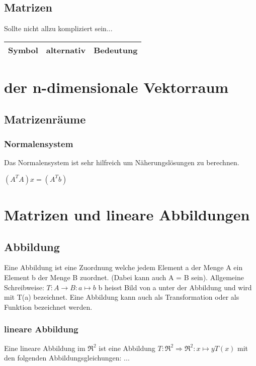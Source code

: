 \documentclass[11pt,a4paper,onecolumn]{article}
\begin{document}
\begin{flushleft}
\subsection{Matrizen}
Sollte nicht allzu kompliziert sein... \linebreak
\begin{tabular}{|c|c|c|}
\hline
Symbol & alternativ & Bedeutung \\
\hline


\end{tabular}
\section{der n-dimensionale Vektorraum}
\subsection{Matrizenräume}
\subsubsection{Normalensystem}
Das Normalensystem ist sehr hilfreich um Näherungslösungen zu berechnen.\linebreak
\linebreak

$(A^{T}A)x=(A^{T}b)$

\section{Matrizen und lineare Abbildungen}
\subsection{Abbildung}
Eine Abbildung ist eine Zuordnung welche jedem Element a der Menge A ein Element b der Menge B zuordnet. (Dabei kann auch A = B sein).\linebreak
Allgemeine Schreibweise:
$T : A \longrightarrow B : a \mapsto b$
b heisst Bild von a unter der Abbildung und wird mit T(a) bezeichnet.\linebreak
Eine Abbildung kann auch als Transformation oder als Funktion bezeichnet werden.

\subsubsection{lineare Abbildung}
Eine lineare Abbildung im $\Re^{2}$ ist eine Abbildung
$T:\Re^{2} \Rightarrow \Re^{2} : x \mapsto y T(x)$
mit den folgenden Abbildungsgleichungen:
...\linebreak


\end{flushleft}
\end{document}
